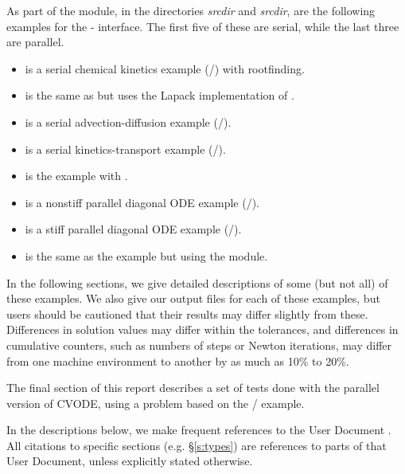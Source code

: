 \vspace{0.2in}\noindent
As part of the {\fcvode} module, in the directories 
{\em srcdir} and
{\em srcdir}, are the following examples for
the {\F}-{\CC} interface.  The first five of these are serial, while
the last three are parallel.
\begin{itemize}
\item {} is a serial chemical kinetics example (/{\sunlinsoldense})
  with rootfinding.
\item {} is the same as  but uses the Lapack
  implementation of {\sunlinsollapdense}.
\item {} is a serial advection-diffusion example (/{\sunlinsolband}).
\item {} is a serial kinetics-transport example (/{\sunlinsolspgmr}).
\item {} is the  example with {\fcvbp}.
\item {} is a nonstiff parallel diagonal ODE example
  (/).
\item {} is a stiff parallel diagonal ODE example (/{\sunlinsolspgmr}).
\item {} is the same as the  example
       but using the {\fcvbbd} module.
\end{itemize}

\vspace{0.2in}\noindent
In the following sections, we give detailed descriptions of some (but
not all) of these examples.  We also give our output files for
each of these examples, but users should be cautioned that their
results may differ slightly from these.  Differences in solution
values may differ within the tolerances, and differences in cumulative
counters, such as numbers of steps or Newton iterations, may differ
from one machine environment to another by as much as 10\% to 20\%.

The final section of this report describes a set of tests done with the
parallel version of CVODE, using a problem based on the
/ example.

In the descriptions below, we make frequent references to the {\cvode}
User Document \cite{cvode_ug}.  All citations to specific sections
(e.g. \S\ref{s:types}) are references to parts of that User Document, unless
explicitly stated otherwise.

